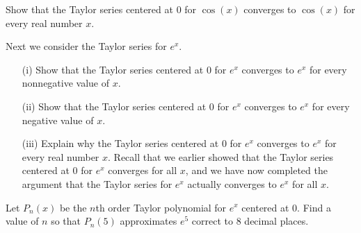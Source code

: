 \begin{activity} \label{8.5.Act6}
\ba
\item Show that the Taylor series centered at 0 for $\cos(x)$ converges to $\cos(x)$ for every real number $x$.
\item Next we consider the Taylor series for $e^x$.
    \begin{itemize}
    \item[(i)] Show that the Taylor series centered at 0 for $e^x$ converges to $e^x$ for every nonnegative value of $x$.
    \item[(ii)] Show that the Taylor series centered at 0 for $e^x$ converges to $e^x$ for every negative value of $x$.
    \item[(iii)] Explain why the Taylor series centered at 0 for $e^x$ converges to $e^x$ for every real number $x$. Recall that we earlier showed that the Taylor series centered at 0 for $e^x$ converges for all $x$, and we have now completed the argument that the Taylor series for $e^x$ actually converges to $e^x$ for all $x$.
    \end{itemize}
\item Let $P_n(x)$ be the $n$th order Taylor polynomial for $e^x$ centered at 0. Find a value of $n$ so that $P_n(5)$ approximates $e^5$ correct to 8 decimal places.
\ea


\end{activity}


